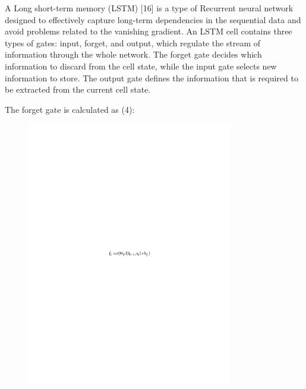 A Long short-term memory (LSTM) {[}16{]} is a type of Recurrent neural
network designed to effectively capture long-term dependencies in the
sequential data and avoid problems related to the vanishing gradient. An
LSTM cell contains three types of gates: input, forget, and output,
which regulate the stream of information through the whole network. The
forget gate decides which information to discard from the cell state,
while the input gate selects new information to store. The output gate
defines the information that is required to be extracted from the
current cell state.

The forget gate is calculated as (4):

\begin{figure}[H]
	\centering
	\includegraphics[width=0.8\textwidth]{media/ict/image45}
	\caption*{}
\end{figure}


